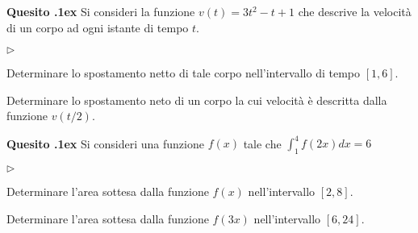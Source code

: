 \documentclass[11pt,twoside,a4paper]{article}
\newcommand{\mylabel}[1]{#1\hfill}
\renewenvironment{itemize}
  {\begin{list}{$\triangleright$}{%
   \setlength{\parskip}{0mm}
   \setlength{\topsep}{.4\baselineskip}
   \setlength{\rightmargin}{0mm}
   \setlength{\listparindent}{0mm}
   \setlength{\itemindent}{0mm}
   \setlength{\labelwidth}{2ex}
   \setlength{\itemsep}{.4\baselineskip}
   \setlength{\parsep}{0mm}
   \setlength{\partopsep}{0mm}
   \setlength{\labelsep}{1ex}
   \setlength{\leftmargin}{\labelwidth+\labelsep}
   \let\makelabel\mylabel}}{%
   \end{list}\vspace*{-1.3mm}}
\newcounter{quesito}
\newenvironment{question}{\bigskip\addtocounter{quesito}{1}\bigskip\bigskip\par\textbf{Quesito \thequesito.\kern1ex}}{\vspace{\parskip}}
\begin{document}
\begin{question}
Si consideri la funzione $v(t) = 3 t^2 - t +1$ che descrive la velocit\`a di un corpo ad ogni istante di tempo $t$.
\begin{itemize}
\item[1.] Determinare lo spostamento netto di tale corpo nell'intervallo di tempo $[1, 6]$.
\item[2.] Determinare lo spostamento neto di un corpo la cui velocit\`a \`e descritta dalla funzione $v(t/2)$.
\end{itemize}
\end{question}
\begin{question}
Si consideri una funzione $f(x)$ tale che $\displaystyle \int_1^4 f(2x) dx = 6$
\begin{itemize}
\item[1.] Determinare l'area sottesa dalla funzione $f(x)$ nell'intervallo $[2,8]$.
\item[2.] Determinare l'area sottesa dalla funzione $f(3x)$ nell'intervallo $[6,24]$.
\end{itemize}
\end{question}
\end{document}
